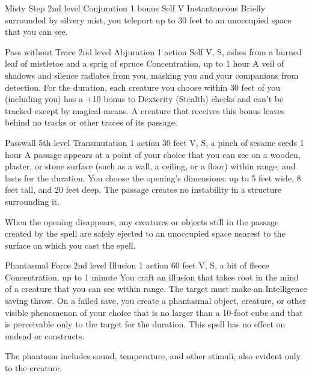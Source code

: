 \documentclass[10pt,a4paper,twoside,bg=print,twocolumn,openany,nodeprecatedcode]{dndbook}
\begin{document}


\DndSpellHeader%
{Misty Step}
{2nd level Conjuration}
{1 bonus}
{Self}
{V}
{Instantaneous}
Briefly surrounded by silvery mist, you teleport up to 30 feet to an unoccupied space that you can see.



\DndSpellHeader%
{Pass without Trace}
{2nd level Abjuration}
{1 action}
{Self}
{V, S, ashes from a burned leaf of mistletoe and a sprig of spruce}
{Concentration, up to 1 hour}
A veil of shadows and silence radiates from you, masking you and your companions from detection. For the duration, each creature you choose within 30 feet of you (including you) has a +10 bonus to Dexterity (Stealth) checks and can't be tracked except by magical means. A creature that receives this bonus leaves behind no tracks or other traces of its passage.



\DndSpellHeader%
{Passwall}
{5th level Transmutation}
{1 action}
{30 feet}
{V, S, a pinch of sesame seeds}
{1 hour}
A passage appears at a point of your choice that you can see on a wooden, plaster, or stone surface (such as a wall, a ceiling, or a floor) within range, and lasts for the duration. You choose the opening's dimensions: up to 5 feet wide, 8 feet tall, and 20 feet deep. The passage creates no instability in a structure surrounding it.

When the opening disappears, any creatures or objects still in the passage created by the spell are safely ejected to an unoccupied space nearest to the surface on which you cast the spell.



\DndSpellHeader%
{Phantasmal Force}
{2nd level Illusion}
{1 action}
{60 feet}
{V, S, a bit of fleece}
{Concentration, up to 1 minute}
You craft an illusion that takes root in the mind of a creature that you can see within range. The target must make an Intelligence saving throw. On a failed save, you create a phantasmal object, creature, or other visible phenomenon of your choice that is no larger than a 10-foot cube and that is perceivable only to the target for the duration. This spell has no effect on undead or constructs.

The phantasm includes sound, temperature, and other stimuli, also evident only to the creature.
\end{document}
